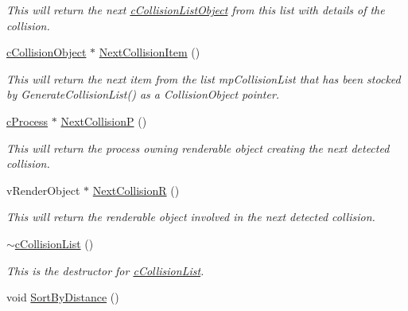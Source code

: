 \begin{DoxyCompactItemize}
\begin{DoxyCompactList}\small\item\em This will return the next \hyperlink{classc_collision_list_object}{cCollisionListObject} from this list with details of the collision. \end{DoxyCompactList}\item 
\hypertarget{classc_collision_list_adeef80e9e181e81dc073ebcfa1d8bec4}{
\hyperlink{classc_collision_object}{cCollisionObject} $\ast$ \hyperlink{classc_collision_list_adeef80e9e181e81dc073ebcfa1d8bec4}{NextCollisionItem} ()}
\label{classc_collision_list_adeef80e9e181e81dc073ebcfa1d8bec4}

\begin{DoxyCompactList}\small\item\em This will return the next item from the list mpCollisionList that has been stocked by GenerateCollisionList() as a CollisionObject pointer. \end{DoxyCompactList}\item 
\hypertarget{classc_collision_list_ac641346bbc7e3d3b84880ae03b0496c5}{
\hyperlink{classc_process}{cProcess} $\ast$ \hyperlink{classc_collision_list_ac641346bbc7e3d3b84880ae03b0496c5}{NextCollisionP} ()}
\label{classc_collision_list_ac641346bbc7e3d3b84880ae03b0496c5}

\begin{DoxyCompactList}\small\item\em This will return the process owning renderable object creating the next detected collision. \end{DoxyCompactList}\item 
\hypertarget{classc_collision_list_a87c8ee3baa85ff002030c83bd1784192}{
vRenderObject $\ast$ \hyperlink{classc_collision_list_a87c8ee3baa85ff002030c83bd1784192}{NextCollisionR} ()}
\label{classc_collision_list_a87c8ee3baa85ff002030c83bd1784192}

\begin{DoxyCompactList}\small\item\em This will return the renderable object involved in the next detected collision. \end{DoxyCompactList}\item 
\hypertarget{classc_collision_list_a628ed6510cd89c192a402be0a64ea111}{
\hyperlink{classc_collision_list_a628ed6510cd89c192a402be0a64ea111}{$\sim$cCollisionList} ()}
\label{classc_collision_list_a628ed6510cd89c192a402be0a64ea111}

\begin{DoxyCompactList}\small\item\em This is the destructor for \hyperlink{classc_collision_list}{cCollisionList}. \end{DoxyCompactList}\item 
\hypertarget{classc_collision_list_ae279c0239ead11e2d6c3647495347cc4}{
void \hyperlink{classc_collision_list_ae279c0239ead11e2d6c3647495347cc4}{SortByDistance} ()}
\label{classc_collision_list_ae279c0239ead11e2d6c3647495347cc4}


\end{DoxyCompactItemize}
